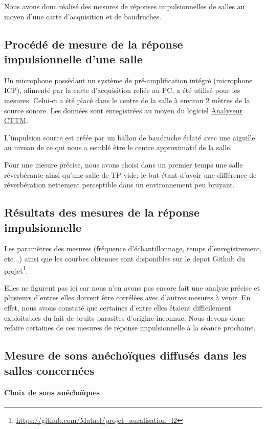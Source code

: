 \documentclass[12pt]{article}
\begin{document}
Nous avons donc réalisé des mesures de réponses impulsionnelles de salles au moyen d'une carte d'acquisition et de baudruches.

\subsection{Procédé de mesure de la réponse impulsionnelle d'une salle}

Un microphone possèdant un système de pré-amplification intégré (microphone ICP), alimenté par la carte d'acquisition reliée au PC, a été utilisé pour les mesures. Celui-ci a été placé dans le centre de la salle à environ 2 mètres de la source sonore. Les données sont enregistrées au moyen du logiciel \underline{Analyseur CTTM}.

L'impulsion source est créée par un ballon de baudruche éclaté avec une aiguille au niveau de ce qui nous a semblé être le centre approximatif de la salle.

Pour une mesure précise, nous avons choisi dans un premier temps une salle réverbérante ainsi qu'une salle de TP vide; le but étant d'avoir une différence de réverbération nettement perceptible dans un environnement peu bruyant.

\subsection{Résultats des mesures de la réponse impulsionnelle}

Les paramètres des mesures (fréquence d'échantillonnage, temps d'enregistrement, etc...) ainsi que les courbes obtenues sont disponibles sur le depot Github du projet\footnote{\url{https://github.com/Matael/projet_auralisation_l2}}.

Elles ne figurent pas ici car nous n'en avons pas encore fait une analyse précise et plusieurs d'entres elles doivent être corrélées avec d'autres mesures à venir. En effet, nous avons constaté que certaines d'entre elles étaient difficilement exploitables du fait de bruits parasites d'origine inconnue. Nous devons donc refaire certaines de ces mesures de réponse impulsionnelle à la séance prochaine.

\subsection{Mesure de sons anéchoïques diffusés dans les salles concernées}

\paragraph{Choix de sons anéchoïques}
\end{document}
